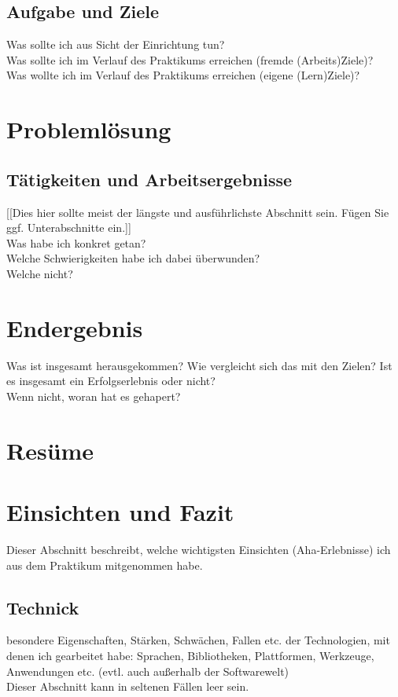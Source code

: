 \documentclass[pdftex,12pt,a4paper]{scrreprt}
\begin{document}
\subsection{Aufgabe und Ziele}
Was sollte ich aus Sicht der Einrichtung tun?\\
Was sollte ich im Verlauf des Praktikums erreichen (fremde (Arbeits)Ziele)?\\
Was wollte ich im Verlauf des Praktikums erreichen (eigene (Lern)Ziele)?\\

\section{Problemlösung}
\subsection{Tätigkeiten und Arbeitsergebnisse}
[[Dies hier sollte meist der längste und ausführlichste Abschnitt sein. Fügen Sie ggf.
Unterabschnitte ein.]]\\
Was habe ich konkret getan?\\
Welche Schwierigkeiten habe ich dabei überwunden?\\
Welche nicht?\\

\section{Endergebnis}
Was ist insgesamt herausgekommen?
Wie vergleicht sich das mit den Zielen? Ist es insgesamt ein Erfolgserlebnis oder nicht?\\
Wenn nicht, woran hat es gehapert?\\
\section{Resüme}
\section{Einsichten und Fazit}
Dieser Abschnitt beschreibt, welche wichtigsten Einsichten (Aha-Erlebnisse) ich aus dem
Praktikum mitgenommen habe.

\subsection{Technick}
besondere Eigenschaften, Stärken, Schwächen, Fallen etc. der Technologien, mit denen
ich gearbeitet habe: Sprachen, Bibliotheken, Plattformen, Werkzeuge, Anwendungen etc.
(evtl. auch außerhalb der Softwarewelt)\\
Dieser Abschnitt kann in seltenen Fällen leer sein.
\end{document}
